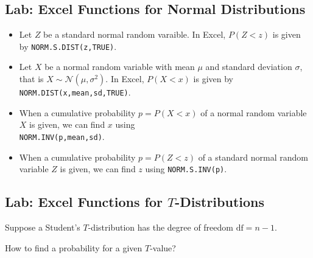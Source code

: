 \vspace*{6\baselineskip}

\hypertarget{lab-excel-functions-for-normal-distributions}{%
\subsection{Lab: Excel Functions for Normal
Distributions}\label{lab-excel-functions-for-normal-distributions}}

\begin{itemize}
\item
  Let \(Z\) be a standard normal random varaible. In Excel, \(P(Z<z)\)
  is given by \texttt{NORM.S.DIST(z,TRUE)}.
\item
  Let \(X\) be a normal random variable with mean \(\mu\) and standard
  deviation \(\sigma\), that is \(X\sim \mathcal{N}(\mu, \sigma^2)\). In
  Excel, \(P(X<x)\) is given by \texttt{NORM.DIST(x,mean,sd,TRUE)}.
\item
  When a cumulative probability \(p=P(X<x)\) of a normal random variable
  \(X\) is given, we can find \(x\) using\\ \texttt{NORM.INV(p,mean,sd)}.
\item
  When a cumulative probability \(p=P(Z<z)\) of a standard normal random
  variable \(Z\) is given, we can find \(z\) using
  \texttt{NORM.S.INV(p)}.
\end{itemize}

\hypertarget{lab-excel-functions-for-t-distributions}{%
\subsection{\texorpdfstring{Lab: Excel Functions for
\(T\)-Distributions}{Lab: Excel Functions for T-Distributions}}\label{lab-excel-functions-for-t-distributions}}

Suppose a Student's \(T\)-distribution has the degree of freedom
\(\text{df}=n-1\).

How to find a probability for a given \(T\)-value?

